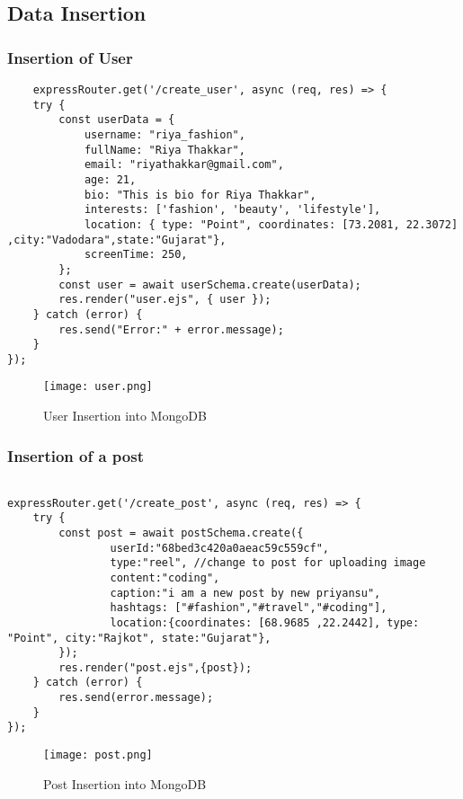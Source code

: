 \documentclass[12pt,a4paper]{article}
\begin{document}
\subsection{Data Insertion}
\subsubsection{Insertion of User}
\begin{lstlisting}
    expressRouter.get('/create_user', async (req, res) => {
    try {
        const userData = {
            username: "riya_fashion",
            fullName: "Riya Thakkar",
            email: "riyathakkar@gmail.com",
            age: 21,
            bio: "This is bio for Riya Thakkar",
            interests: ['fashion', 'beauty', 'lifestyle'],
            location: { type: "Point", coordinates: [73.2081, 22.3072] ,city:"Vadodara",state:"Gujarat"},
            screenTime: 250,
        };
        const user = await userSchema.create(userData);
        res.render("user.ejs", { user });
    } catch (error) {
        res.send("Error:" + error.message);
    }
});
\end{lstlisting}


\begin{figure}[h]
    \centering
    \texttt{[image: user.png]}
    \caption{User Insertion into MongoDB}
    \label{fig:sample}
\end{figure}

\vspace{2.5in}
\subsubsection{Insertion of a post}
\begin{lstlisting}
    
expressRouter.get('/create_post', async (req, res) => {
    try {
        const post = await postSchema.create({
                userId:"68bed3c420a0aeac59c559cf",
                type:"reel", //change to post for uploading image 
                content:"coding",
                caption:"i am a new post by new priyansu",
                hashtags: ["#fashion","#travel","#coding"],
                location:{coordinates: [68.9685 ,22.2442], type: "Point", city:"Rajkot", state:"Gujarat"},
        });
        res.render("post.ejs",{post});
    } catch (error) {
        res.send(error.message);
    }
});
\end{lstlisting}


\begin{figure}[H]
    \centering
    \texttt{[image: post.png]}
    \caption{Post Insertion into MongoDB}
    \label{fig:sample}
\end{figure}
\end{document}
